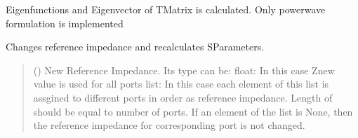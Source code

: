 \documentclass[letterpaper,10pt,english]{sphinxmanual}
\begin{document}
\begin{fulllineitems}
\begin{fulllineitems}
\begin{quote}
\begin{description}
\end{description}\end{quote}

\end{fulllineitems}


\begin{fulllineitems}
\label{\detokenize{touchstone:touchstone.spfile.calc_t_eigs}}
\pysigstartsignatures
{}
\pysigstopsignatures
\sphinxAtStartPar
Eigenfunctions and Eigenvector of T\sphinxhyphen{}Matrix is calculated.
Only power\sphinxhyphen{}wave formulation is implemented

\end{fulllineitems}


\begin{fulllineitems}
\label{\detokenize{touchstone:touchstone.spfile.change_formulation}}
\pysigstartsignatures
{}
\pysigstopsignatures
\end{fulllineitems}


\begin{fulllineitems}
\label{\detokenize{touchstone:touchstone.spfile.change_ref_impedance}}
\pysigstartsignatures
{}
\pysigstopsignatures
\sphinxAtStartPar
Changes reference impedance and re\sphinxhyphen{}calculates S\sphinxhyphen{}Parameters.
\begin{quote}\begin{description}
\sphinxAtStartPar
{} () \textendash{} New Reference Impedance. Its type can be:
\sphinxhyphen{} float: In this case Znew value is used for all ports
\sphinxhyphen{} list: In this case each element of this list is assgined to different ports in order as reference impedance. Length of  should be equal to number of ports. If an element of the list is None, then the reference impedance for corresponding port is not changed.


\end{description}
\end{quote}
\end{fulllineitems}
\end{fulllineitems}
\end{document}
